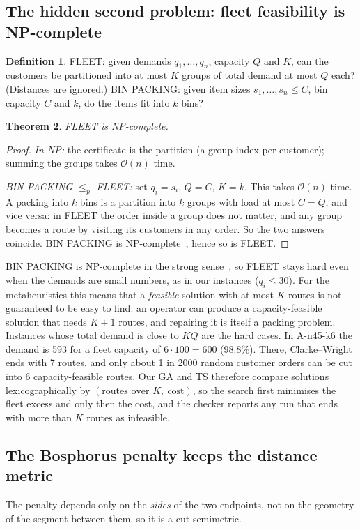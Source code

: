 \documentclass[11pt,a4paper]{article}
\newtheorem{theorem}{Theorem}
\theoremstyle{definition}
\newtheorem{definition}[theorem]{Definition}
\theoremstyle{remark}
\newcommand{\Ocal}{\mathcal{O}}
\begin{document}
\subsection{The hidden second problem: fleet feasibility is NP-complete}
\begin{definition}
FLEET: given demands $q_1,\dots,q_n$, capacity $Q$ and $K$, can the customers be
partitioned into at most $K$ groups of total demand at most $Q$ each? (Distances are
ignored.) BIN PACKING: given item sizes $s_1,\dots,s_n\le C$, bin capacity $C$ and $k$, do
the items fit into $k$ bins?
\end{definition}

\begin{theorem}\label{thm:bp}
FLEET is NP-complete.
\end{theorem}
\begin{proof}
\emph{In NP:} the certificate is the partition (a group index per customer); summing the
groups takes $\Ocal(n)$ time.

\emph{BIN PACKING $\le_p$ FLEET:} set $q_i=s_i$, $Q=C$, $K=k$. This takes $\Ocal(n)$ time.
A packing into $k$ bins is a partition into $k$ groups with load at most $C=Q$, and vice
versa: in FLEET the order inside a group does not matter, and any group becomes a route by
visiting its customers in any order. So the two answers coincide. BIN PACKING is
NP-complete~\cite{garey1979}, hence so is FLEET.
\end{proof}

BIN PACKING is NP-complete in the strong sense~\cite{garey1979}, so FLEET stays hard even
when the demands are small numbers, as in our instances ($q_i\le 30$). For the
metaheuristics this means that a \emph{feasible} solution with at most $K$ routes is not
guaranteed to be easy to find: an operator can produce a capacity-feasible solution that
needs $K+1$ routes, and repairing it is itself a packing problem. Instances whose total
demand is close to $KQ$ are the hard cases. In A-n45-k6 the demand is 593 for a fleet
capacity of $6\cdot 100=600$ (98.8\%). There, Clarke--Wright ends with 7 routes, and only
about 1 in 2000 random customer orders can be cut into 6 capacity-feasible routes. Our GA
and TS therefore compare solutions lexicographically by $(\text{routes over }K,\ \text{cost})$,
so the search first minimises the fleet excess and only then the cost, and the checker
reports any run that ends with more than $K$ routes as infeasible.

\subsection{The Bosphorus penalty keeps the distance metric}
The penalty depends only on the \emph{sides} of the two endpoints, not on the geometry of
the segment between them, so it is a cut semimetric.
\end{document}
